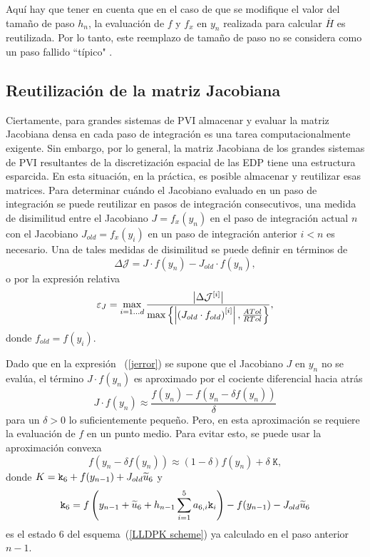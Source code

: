 Aquí hay que tener en cuenta que en el caso de que se modifique el valor del tamaño de paso $h_{n}$, la evaluación de $f$ y $f_x$ en $y_n$ realizada para calcular $\overline{H}$ es reutilizada. Por lo tanto, este reemplazo de tamaño de paso no se considera como un paso fallido ``típico" .

\subsection{Reutilización de la matriz Jacobiana}\label{secc:jaccontrol}
Ciertamente, para grandes sistemas de PVI almacenar y evaluar la matriz Jacobiana densa en cada paso de integración es una tarea computacionalmente exigente. Sin embargo, por lo general, la matriz Jacobiana de los grandes sistemas de PVI resultantes de la discretización espacial de las EDP tiene una estructura esparcida. En esta situación, en la práctica, es posible almacenar y reutilizar esas matrices. Para determinar cuándo el Jacobiano evaluado en un paso de integración se puede reutilizar en pasos de integración consecutivos, una medida de disimilitud entre el Jacobiano $J=f_x(y_n)$ en el paso de integración actual $n$ con el Jacobiano $J_{old}= f_x(y_{i})$ en un paso de integración anterior $i<n$ es necesario. Una de tales medidas de disimilitud se puede definir en términos de
\begin{equation*}
    \Delta \mathcal{J} = J\cdot f(y_n) - J_{old}\cdot f(y_n),
\end{equation*}
o por la expresión relativa
\begin{equation}\label{jerror}
    \varepsilon_J = \max_{i=1\ldots d}\frac{\left\lvert \Delta \mathcal{J}^{[i]} \right\rvert}
    {\max\left\{ \left\lvert  \left(J_{old}\cdot f_{old}\right)^{[i]}  \right\rvert ,\frac{ATol}{RTol} \right\}},
\end{equation}
donde $f_{old}=f(y_i)$.

Dado que en la expresión ~(\ref{jerror}) se supone que el Jacobiano $J$ en $y_n$ no se evalúa, el término $J\cdot f(y_n)$ es
aproximado por el cociente diferencial hacia atrás
\begin{equation}\label{backapprox}
    J\cdot f(y_n) \approx \frac{f(y_n) -
        f\left(y_n-\delta f(y_n)\right)}{\delta}
\end{equation}
para un $\delta>0$ lo suficientemente pequeño. Pero, en esta aproximación se requiere la evaluación de $f$ en un punto medio. Para evitar esto, se puede usar la aproximación convexa
\begin{equation}\label{aproxaprox}
    f\left(y_n-\delta f(y_n)\right) \approx
    (1-\delta) f(y_n)+ \delta \; \mathtt{K},
\end{equation}
donde $K = \mathtt{k}_{6} + f(y_{n-1}) + J_{old}\widetilde{u}_{6} $ y
\[ \mathtt{k}_6 = f\left( y_{n-1}+\widetilde{u}_6+h_{n-1} \sum_{i=1}^{5}a_{6,i}\mathtt{k}_i \right) - f(y_{n-1}) - J_{old}\widetilde{u}_6 \]
es el estado $6$ del esquema~(\ref{LLDPK scheme}) ya calculado en el paso anterior $n-1$.

